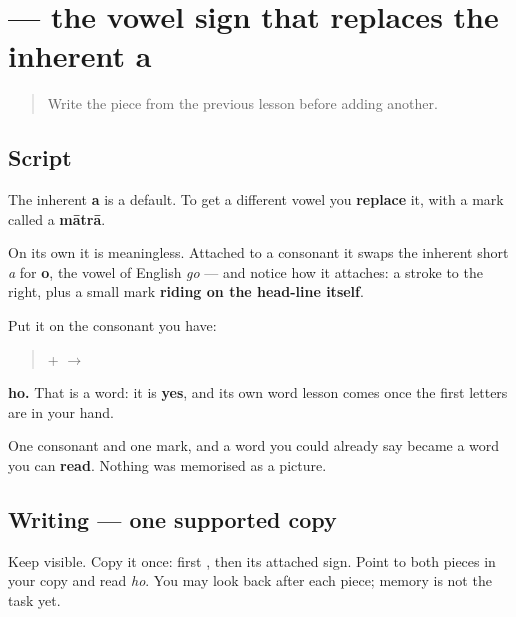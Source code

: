 \section[\texorpdfstring{\mr{ो} (-o)}{ो (-o)}]{ — the vowel sign that replaces the inherent a}

\label{lesson:MR-W01-o-matra}



\begin{quote}
Write the piece from the previous lesson before adding another.
\end{quote}

\subsection*{Script}
The inherent \textbf{a} is a default. To get a different vowel you \textbf{replace} it, with a mark called a \textbf{mātrā}.

\begin{quote}
\end{quote}

On its own it is meaningless. Attached to a consonant it swaps the inherent short \emph{a} for \textbf{o}, the vowel of English \emph{go} — and notice how it attaches: a stroke to the right, plus a small mark \textbf{riding on the head-line itself}.

Put it on the consonant you have:

\begin{quote}
\textbf{} + \textbf{} $\to$ \textbf{}
\end{quote}

\textbf{ho.} That is a word: it is \textbf{yes}, and its own word lesson comes once the first letters are in your hand.

One consonant and one mark, and a word you could already say became a word you can \textbf{read}. Nothing was memorised as a picture.

\subsection*{Writing — one supported copy}

Keep \textbf{} visible. Copy it once: first \textbf{}, then its attached \textbf{} sign. Point to both pieces in your copy and read \emph{ho}. You may look back after each piece; memory is not the task yet.

